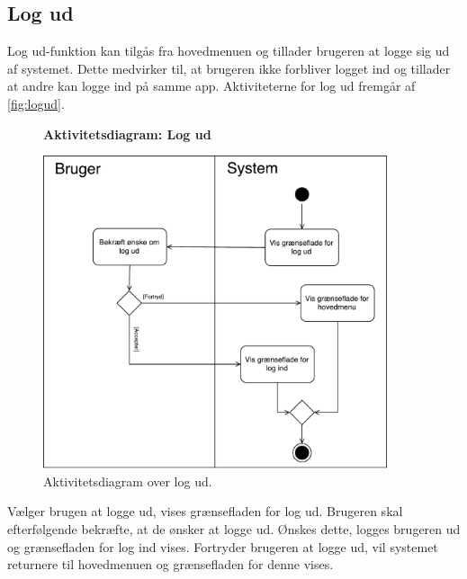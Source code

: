 \subsection*{Log ud}
Log ud-funktion kan tilgås fra hovedmenuen og tillader brugeren at logge sig ud af systemet. Dette medvirker til, at brugeren ikke forbliver logget ind og tillader at andre  kan logge ind på samme app.
Aktiviteterne for log ud fremgår af \autoref{fig:logud}.

\begin{figure} [H]
\centering
\textbf{Aktivitetsdiagram: Log ud}\par\medskip
\includegraphics[width=0.9\textwidth]{figures/aktivitetsdiagram/Logud}
\caption{Aktivitetsdiagram over log ud.}
\label{fig:logud}
\end{figure}

\noindent
Vælger brugen at logge ud, vises grænsefladen for log ud. 
Brugeren skal efterfølgende bekræfte, at de ønsker at logge ud. Ønskes dette, logges brugeren ud og grænsefladen for log ind vises. Fortryder brugeren at logge ud, vil systemet returnere til hovedmenuen og grænsefladen for denne vises.  